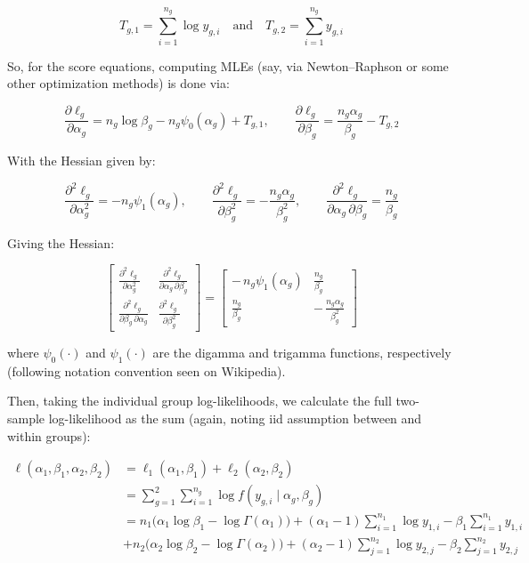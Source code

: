 \documentclass[
]{article}
\begin{document}
\[
T_{g,1}=\sum_{i=1}^{n_g}\log y_{g,i}
\quad\text{and}\quad
T_{g,2}=\sum_{i=1}^{n_g} y_{g,i}
\]

So, for the score equations, computing MLEs (say, via Newton--Raphson or
some other optimization methods) is done via:

\[
\frac{\partial \ell_g}{\partial \alpha_g}
= n_g\log \beta_g - n_g\psi_{0}(\alpha_g) + T_{g,1}, 
\qquad
\frac{\partial \ell_g}{\partial \beta_g}
= \frac{n_g\alpha_g}{\beta_g} - T_{g,2}
\]

With the Hessian given by:

\[
\frac{\partial^2 \ell_g}{\partial \alpha_g^2}
= -n_g \psi_{1}(\alpha_g),\qquad
\frac{\partial^2 \ell_g}{\partial \beta_g^2}
= -\frac{n_g\alpha_g}{\beta_g^2},\qquad
\frac{\partial^2 \ell_g}{\partial \alpha_g\,\partial \beta_g}
=\frac{n_g}{\beta_g}
\]

Giving the Hessian:

\[
\begin{bmatrix}
\displaystyle \frac{\partial^2 \ell_g}{\partial \alpha_g^2} &
\displaystyle \frac{\partial^2 \ell_g}{\partial \alpha_g \,\partial \beta_g} \\[1.2em]
\displaystyle \frac{\partial^2 \ell_g}{\partial \beta_g \,\partial \alpha_g} &
\displaystyle \frac{\partial^2 \ell_g}{\partial \beta_g^2}
\end{bmatrix}
=
\begin{bmatrix}
-\,n_g \psi_{1}(\alpha_g) & \tfrac{n_g}{\beta_g} \\[0.8em]
\tfrac{n_g}{\beta_g} & -\,\tfrac{n_g \alpha_g}{\beta_g^2}
\end{bmatrix}
\]

where \(\psi_{0}(\cdot)\) and \(\psi_{1}(\cdot)\) are the digamma and
trigamma functions, respectively (following notation convention seen on
Wikipedia).

Then, taking the individual group log-likelihoods, we calculate the full
two-sample log-likelihood as the sum (again, noting iid assumption
between and within groups):

\[
\begin{aligned}
\ell(\alpha_1,\beta_1,\alpha_2,\beta_2)
&= \ell_1(\alpha_1,\beta_1)+\ell_2(\alpha_2,\beta_2) \\ 
&= \sum_{g=1}^{2}\sum_{i=1}^{n_g}\log f(y_{g,i}\mid \alpha_g,\beta_g) \\ 
&= n_1\Big(\alpha_1\log\beta_1-\log\Gamma(\alpha_1)\Big)
+(\alpha_1-1)\sum_{i=1}^{n_1}\log y_{1,i}
-\beta_1\sum_{i=1}^{n_1} y_{1,i} \\ 
&+ n_2\Big(\alpha_2\log\beta_2-\log\Gamma(\alpha_2)\Big)
+(\alpha_2-1)\sum_{j=1}^{n_2}\log y_{2,j}
-\beta_2\sum_{j=1}^{n_2} y_{2,j} \\
\end{aligned}
\]
\end{document}
